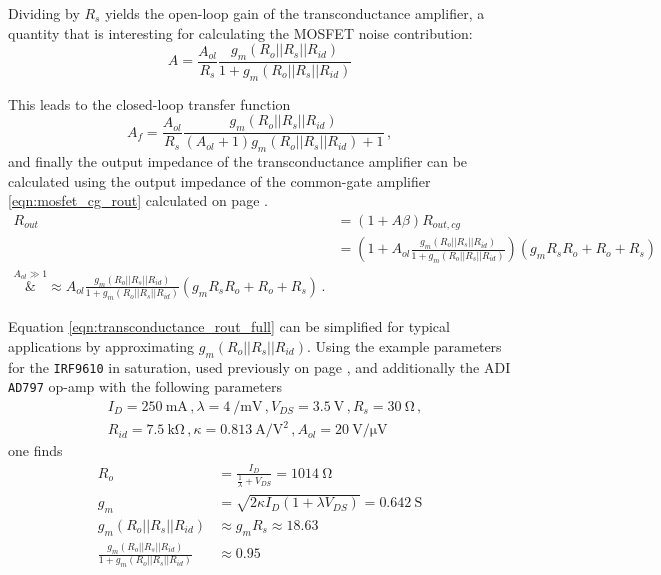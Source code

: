 \documentclass[12pt]{book}
\providecommand{\device}[1]{\texttt{\small #1}}
\begin{document}
Dividing by $R_s$ yields the open-loop gain of the transconductance amplifier, a quantity that is interesting for calculating the MOSFET noise contribution:
\begin{equation}
    A = \frac{A_{ol}}{R_s} \frac{g_m \left(R_o || R_s || R_{id}\right)}{1 + g_m \left(R_o || R_s || R_{id}\right)} \label{eqn:transconductance_amplifier_open_loop_gain}
\end{equation}

This leads to the closed-loop transfer function
\begin{equation}
    A_f = \frac{A_{ol}}{R_s} \frac{g_m \left(R_o || R_s || R_{id}\right)}{(A_{ol}+1)g_m \left(R_o || R_s || R_{id}\right) + 1} \label{eqn:transconductance_amplifier_transfer_function} \,,
\end{equation}
and finally the output impedance of the transconductance amplifier can be calculated using the output impedance of the common-gate amplifier \ref{eqn:mosfet_cg_rout} calculated on page \pageref{eqn:mosfet_cg_rout}.
\begin{align}
    R_{out} &= \left(1+ A\beta\right) R_{out,cg} \nonumber\\
    &= \left(1 + A_{ol} \frac{g_m \left(R_o || R_s || R_{id}\right)}{1 + g_m \left(R_o || R_s || R_{id}\right)} \right) \left(g_m R_s R_o + R_o + R_s \right) \nonumber\\
    \overset{A_{ol} \gg 1}&{\approx} A_{ol} \frac{g_m \left(R_o || R_s || R_{id}\right)}{1 + g_m \left(R_o || R_s || R_{id}\right)} \left(g_m R_s R_o + R_o + R_s \right) \,. \label{eqn:transconductance_rout_full}
\end{align}

Equation \ref{eqn:transconductance_rout_full} can be simplified for typical applications by approximating $g_m \left(R_o || R_s || R_{id}\right)$. Using the example parameters for the \device{IRF9610} in saturation, used previously on page \pageref{eqn:mosfet_rout_irf9610}, and additionally the ADI \device{AD797} \cite{datasheet_AD797} op-amp with the following parameters
\begin{align*}
    &I_D = \qty{250}{\mA} \,, \lambda = \qty[per-mode=power]{4}{\per \milli \volt} \,, V_{DS} = \qty{3.5}{\V}\,, R_s = \qty{30}{\ohm}\,,\\
    &R_{id} = \qty{7.5}{\kilo\ohm}\,, \kappa = \qty[per-mode=power]{0.813}{\ampere \per \square\volt}\,, A_{ol} = \qty[per-mode=power]{20}{\volt \per \uV}
\end{align*}
one finds
\begin{align*}
    R_{o} &= \frac{I_D}{\frac{1}{\lambda} + V_{DS}} = \qty{1014}{\ohm}\\
    g_m &= \sqrt{2 \kappa I_D \left(1+ \lambda V_{DS}\right)} = \qty{0.642}{\siemens}\\
    g_m \left(R_o || R_s || R_{id}\right) &\approx g_m R_s \approx \num{18.63}\\
    \frac{g_m \left(R_o || R_s || R_{id}\right)}{1 + g_m \left(R_o || R_s || R_{id}\right)} &\approx \num{0.95}
\end{align*}
\end{document}
